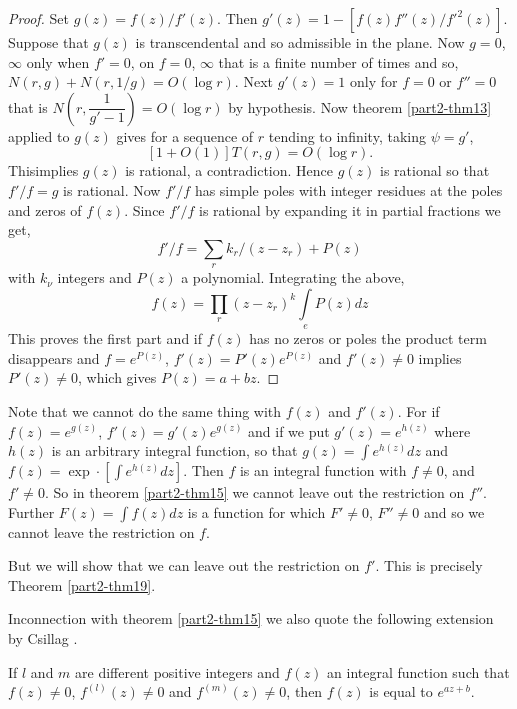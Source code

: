 \begin{proof}
Set $g(z)=f(z)/f'(z)$. Then
$g'(z)=1-[f(z)f''(z)/{f'}^{2}(z)]$. Suppose that $g(z)$ is
transcendental and so admissible in the plane. Now $g=0$, $\infty$
only when $f'=0$, on $f=0$, $\infty$ that is a finite number of times
and so, $N(r,g)+N(r,1/g)=O(\log r)$. Next $g'(z)=1$ only for $f=0$ or
$f''=0$ that is $N\left(r,\dfrac{1}{g'-1}\right)=O(\log r)$ by
hypothesis. Now theorem \ref{part2-thm13} applied to $g(z)$ gives for
a sequence of $r$ tending to infinity, taking $\psi=g'$,
$$
[1+O(1)]T(r,g)=O(\log r).
$$
This\pageoriginale implies $g(z)$ is rational, \ie a
contradiction. Hence $g(z)$ is rational so that $f'/f=g$ is
rational. Now $f'/f$ has simple poles with integer residues at the
poles and zeros of $f(z)$. Since $f'/f$ is rational by expanding it in
partial fractions we get,
$$
f'/f=\sum_{r}k_{r}/(z-z_{r})+P(z)
$$
with $k_{\nu}$ integers and $P(z)$ a polynomial. Integrating the
above,
$$
f(z)=\prod_{r}(z-z_{r})^{k}\int\limits_{e}P(z)dz
$$
This proves the first part and if $f(z)$ has no zeros or poles the
product term disappears and $f=e^{P(z)}$, $f'(z)=P'(z)e^{P(z)}$ and
$f'(z)\neq 0$ implies $P'(z)\neq 0$, which gives $P(z)=a+bz$.
\end{proof}

\begin{remark*}
Note that we cannot do the same thing with $f(z)$ and $f'(z)$. For if
$f(z)=e^{g(z)}$, $f'(z)=g'(z)e^{g(z)}$ and if we put $g'(z)=e^{h(z)}$
where $h(z)$ is an arbitrary integral function, so that $g(z)=\int
e^{h(z)}dz$ and $f(z)=\exp\cdot \left[\int e^{h(z)}dz\right]$. Then
$f$ is an integral function with $f\neq 0$, and $f'\neq 0$. So in
theorem \ref{part2-thm15} we cannot leave out the restriction on
$f''$. Further $F(z)=\int f(z)dz$ is a function for which $F'\neq 0$,
$F''\neq 0$ and so we cannot leave the restriction on $f$. 
\end{remark*}

But we will show that we can leave out the restriction on $f'$. This
is precisely Theorem \ref{part2-thm19}.

In\pageoriginale connection with theorem \ref{part2-thm15} we also
quote the following extension by Csillag \cite{1}.

\begin{thm}\label{part2-thm16}
If $l$ and $m$ are different positive integers and $f(z)$ an integral
function such that $f(z)\neq 0$, $f^{(l)}(z)\neq 0$ and
$f^{(m)}(z)\neq 0$, then $f(z)$ is equal to $e^{az+b}$.
\end{thm}

